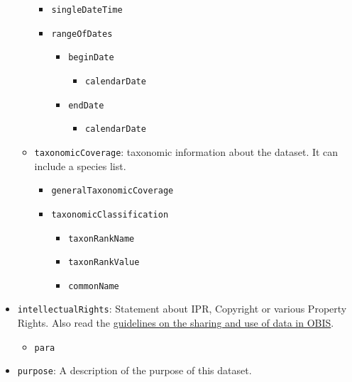 \documentclass[
  letterpaper,
  DIV=11,
  numbers=noendperiod,
  oneside]{scrreprt}
\providecommand{\tightlist}{%
  \setlength{\itemsep}{0pt}\setlength{\parskip}{0pt}}\usepackage{longtable,booktabs,array}
\begin{document}
\begin{itemize}
\begin{itemize}
    \begin{itemize}
    \tightlist
    \item
      \texttt{singleDateTime}
    \item
      \texttt{rangeOfDates}

      \begin{itemize}
      \tightlist
      \item
        \texttt{beginDate}

        \begin{itemize}
        \tightlist
        \item
          \texttt{calendarDate}
        \end{itemize}
      \item
        \texttt{endDate}

        \begin{itemize}
        \tightlist
        \item
          \texttt{calendarDate}
        \end{itemize}
      \end{itemize}
    \end{itemize}
  \item
    \texttt{taxonomicCoverage}: taxonomic information about the dataset.
    It can include a species list.

    \begin{itemize}
    \tightlist
    \item
      \texttt{generalTaxonomicCoverage}
    \item
      \texttt{taxonomicClassification}

      \begin{itemize}
      \tightlist
      \item
        \texttt{taxonRankName}
      \item
        \texttt{taxonRankValue}
      \item
        \texttt{commonName}
      \end{itemize}
    \end{itemize}
  \end{itemize}
\item
  \texttt{intellectualRights}: Statement about IPR, Copyright or various
  Property Rights. Also read the \href{policy.html}{guidelines on the
  sharing and use of data in OBIS}.

  \begin{itemize}
  \tightlist
  \item
    \texttt{para}
  \end{itemize}
\item
  \texttt{purpose}: A description of the purpose of this dataset.


\end{itemize}
\end{document}
